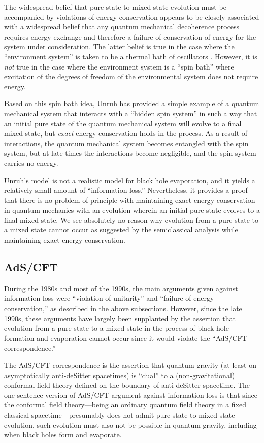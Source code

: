\documentclass[12pt,nofootinbib,amsmath,amssymb,amsfonts,aps,prd,groupedaddress]{revtex4-1}
\begin{document}
The widespread belief that pure state to mixed state evolution must be
accompanied by violations of energy conservation appears to be closely
associated with a widespread belief that any quantum mechanical decoherence
process requires energy exchange and therefore a failure of conservation of
energy for the system under consideration. The latter belief is true in the case
where the ``environment system'' is taken to be a thermal bath of oscillators
\cite{cl}. However, it is {\it not} true in the case where the environment system
is a ``spin bath'' \cite{ps} where excitation of the degrees of freedom of the
environmental system does not require energy. 

Based on this spin bath idea, Unruh \cite{unr} has provided a simple example of a
quantum mechanical system that interacts with a ``hidden spin system'' in such a
way that an initial pure state of the quantum mechanical system will evolve to a
final mixed state, but {\it exact} energy conservation holds in the process. As
a result of interactions, the quantum mechanical system becomes entangled with the
spin system, but at late times the interactions become negligible, and the spin
system carries no energy.

Unruh's model is not a realistic model for black hole evaporation, and it yields
a relatively small amount of ``information loss.'' Nevertheless, it provides a
proof that there is no problem of principle with maintaining exact energy
conservation in quantum mechanics with an evolution wherein an initial pure state
evolves to a final mixed state. We see absolutely no reason why evolution from a
pure state to a mixed state cannot occur as suggested by the semiclassical
analysis while maintaining exact energy conservation.

\subsection{AdS/CFT} \label{ads}

During the 1980s and most of the 1990s, the main arguments given against
information loss were ``violation of unitarity'' and ``failure of energy
conservation,'' as described in the above subsections. However, since the late
1990s, these arguments have largely been supplanted by the assertion that
evolution from a pure state to a mixed state in the process of black hole
formation and evaporation cannot occur since it would violate the ``AdS/CFT
correspondence.''

The AdS/CFT correspondence is the assertion that quantum gravity (at least on
asymptotically anti-deSitter spacetimes) is ``dual'' to a (non-gravitational)
conformal field theory defined on the boundary of anti-deSitter spacetime. The
one sentence version of AdS/CFT argument against information loss is that since
the conformal field theory---being an ordinary quantum field theory in a fixed
classical spacetime---presumably does not admit pure state to mixed state
evolution, such evolution must also not be possible in quantum gravity,
including when black holes form and evaporate. 
\end{document}
